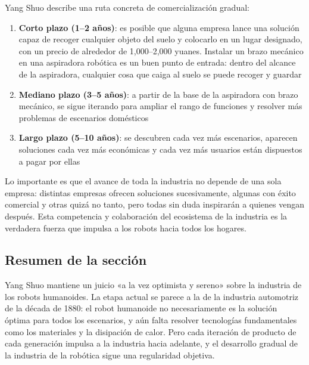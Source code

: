 Yang Shuo describe una ruta concreta de comercialización gradual:

\begin{enumerate}
    \item \textbf{Corto plazo (1--2 años)}: es posible que alguna empresa lance una solución capaz de recoger cualquier objeto del suelo y colocarlo en un lugar designado, con un precio de alrededor de 1,000--2,000 yuanes. Instalar un brazo mecánico en una aspiradora robótica es un buen punto de entrada: dentro del alcance de la aspiradora, cualquier cosa que caiga al suelo se puede recoger y guardar
    \item \textbf{Mediano plazo (3--5 años)}: a partir de la base de la aspiradora con brazo mecánico, se sigue iterando para ampliar el rango de funciones y resolver más problemas de escenarios domésticos
    \item \textbf{Largo plazo (5--10 años)}: se descubren cada vez más escenarios, aparecen soluciones cada vez más económicas y cada vez más usuarios están dispuestos a pagar por ellas
\end{enumerate}

Lo importante es que el avance de toda la industria no depende de una sola empresa: distintas empresas ofrecen soluciones sucesivamente, algunas con éxito comercial y otras quizá no tanto, pero todas sin duda inspirarán a quienes vengan después. Esta competencia y colaboración del ecosistema de la industria es la verdadera fuerza que impulsa a los robots hacia todos los hogares.

\subsection{Resumen de la sección}

Yang Shuo mantiene un juicio «a la vez optimista y sereno» sobre la industria de los robots humanoides. La etapa actual se parece a la de la industria automotriz de la década de 1880: el robot humanoide no necesariamente es la solución óptima para todos los escenarios, y aún falta resolver tecnologías fundamentales como los materiales y la disipación de calor. Pero cada iteración de producto de cada generación impulsa a la industria hacia adelante, y el desarrollo gradual de la industria de la robótica sigue una regularidad objetiva.
